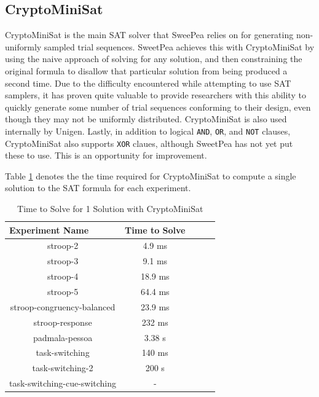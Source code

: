 \begin{verbatim}

\end{verbatim}


\subsection{CryptoMiniSat}

CryptoMiniSat \cite{DBLP:conf/sat/SoosNC09,DBLP:conf/sat/2009} is the main SAT solver that SweePea relies on for generating non-uniformly sampled trial sequences. SweetPea achieves this with CryptoMiniSat by using the naive approach of solving for any solution, and then constraining the original formula to disallow that particular solution from being produced a second time. Due to the difficulty encountered while attempting to use SAT samplers, it has proven quite valuable to provide researchers with this ability to quickly generate some number of trial sequences conforming to their design, even though they may not be uniformly distributed. CryptoMiniSat is also used internally by Unigen. Lastly, in addition to logical \texttt{AND}, \texttt{OR}, and \texttt{NOT} clauses, CryptoMiniSat also supports \texttt{XOR} claues, although SweetPea has not yet put these to use. This is an opportunity for improvement.


Table \ref{tab:benchmark_experiments_cmsat} denotes the the time required for CryptoMiniSat to compute a single solution to the SAT formula for each experiment.


\begin{table}[t]
  \centering
  \caption{Time to Solve for 1 Solution with CryptoMiniSat}
\begin{tabular}{|c|c|c|c|c|}
\hline
\multicolumn{1}{|l|}{Experiment Name} & Time to Solve   \\ \hline
stroop-2                              & 4.9 ms          \\ \hline
stroop-3                              & 9.1 ms          \\ \hline
stroop-4                              & 18.9 ms         \\ \hline
stroop-5                              & 64.4 ms         \\ \hline
stroop-congruency-balanced            & 23.9 ms         \\ \hline
stroop-response                       & 232 ms          \\ \hline
padmala-pessoa                        & 3.38 s          \\ \hline
task-switching                        & 140 ms          \\ \hline
task-switching-2                      & 200 s           \\ \hline
task-switching-cue-switching          & -               \\ \hline
\end{tabular}
\label{tab:benchmark_experiments_cmsat}%
\end{table}


